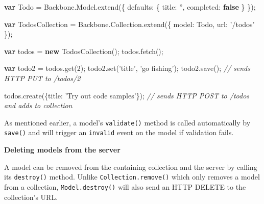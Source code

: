 \documentclass[9pt]{book}
\newenvironment{Shaded}{}{}
\newcommand{\KeywordTok}[1]{\textcolor[rgb]{0.00,0.44,0.13}{\textbf{{#1}}}}
\newcommand{\DataTypeTok}[1]{\textcolor[rgb]{0.56,0.13,0.00}{{#1}}}
\newcommand{\DecValTok}[1]{\textcolor[rgb]{0.25,0.63,0.44}{{#1}}}
\newcommand{\StringTok}[1]{\textcolor[rgb]{0.25,0.44,0.63}{{#1}}}
\newcommand{\CommentTok}[1]{\textcolor[rgb]{0.38,0.63,0.69}{\textit{{#1}}}}
\newcommand{\OtherTok}[1]{\textcolor[rgb]{0.00,0.44,0.13}{{#1}}}
\newcommand{\FunctionTok}[1]{\textcolor[rgb]{0.02,0.16,0.49}{{#1}}}
\newcommand{\NormalTok}[1]{{#1}}
\begin{document}
\begin{Shaded}
\begin{Highlighting}[]
\KeywordTok{var} \NormalTok{Todo = }\OtherTok{Backbone}\NormalTok{.}\OtherTok{Model}\NormalTok{.}\FunctionTok{extend}\NormalTok{(\{}
  \DataTypeTok{defaults}\NormalTok{: \{}
    \DataTypeTok{title}\NormalTok{: }\StringTok{''}\NormalTok{,}
    \DataTypeTok{completed}\NormalTok{: }\KeywordTok{false}
  \NormalTok{\}}
\NormalTok{\});}

\KeywordTok{var} \NormalTok{TodosCollection = }\OtherTok{Backbone}\NormalTok{.}\OtherTok{Collection}\NormalTok{.}\FunctionTok{extend}\NormalTok{(\{}
  \DataTypeTok{model}\NormalTok{: Todo,}
  \DataTypeTok{url}\NormalTok{: }\StringTok{'/todos'}
\NormalTok{\});}

\KeywordTok{var} \NormalTok{todos = }\KeywordTok{new} \FunctionTok{TodosCollection}\NormalTok{();}
\OtherTok{todos}\NormalTok{.}\FunctionTok{fetch}\NormalTok{();}

\KeywordTok{var} \NormalTok{todo2 = }\OtherTok{todos}\NormalTok{.}\FunctionTok{get}\NormalTok{(}\DecValTok{2}\NormalTok{);}
\OtherTok{todo2}\NormalTok{.}\FunctionTok{set}\NormalTok{(}\StringTok{'title'}\NormalTok{, }\StringTok{'go fishing'}\NormalTok{);}
\OtherTok{todo2}\NormalTok{.}\FunctionTok{save}\NormalTok{(); }\CommentTok{// sends HTTP PUT to /todos/2}

\OtherTok{todos}\NormalTok{.}\FunctionTok{create}\NormalTok{(\{}\DataTypeTok{title}\NormalTok{: }\StringTok{'Try out code samples'}\NormalTok{\}); }\CommentTok{// sends HTTP POST to /todos and adds to collection}
\end{Highlighting}
\end{Shaded}

As mentioned earlier, a model's \texttt{validate()} method is called
automatically by \texttt{save()} and will trigger an \texttt{invalid}
event on the model if validation fails.

\textbf{Deleting models from the server}

A model can be removed from the containing collection and the server by
calling its \texttt{destroy()} method. Unlike
\texttt{Collection.remove()} which only removes a model from a
collection, \texttt{Model.destroy()} will also send an HTTP DELETE to
the collection's URL.
\end{document}

